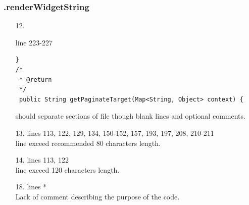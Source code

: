 \documentclass[english]{article}
\begin{document}
\subsubsection*{.renderWidgetString}
\begin{itemize}
    
    	\item[12.]{ line 223-227
		\begin{lstlisting}
}
/*
 * @return
 */
 public String getPaginateTarget(Map<String, Object> context) {
		\end{lstlisting} should separate sections of file though blank lines and optional comments.}
		
\item[13.]{lines 113, 122, 129, 134, 150-152, 157, 193, 197, 208, 210-211 \\
		line exceed recommended 80 characters length.}

\item[14.]{lines  113, 122\\
		line exceed 120 characters length.}
		
		\item[18.]{lines  *\\
		Lack of comment describing the purpose of the code.}


\end{itemize}
\end{document}
